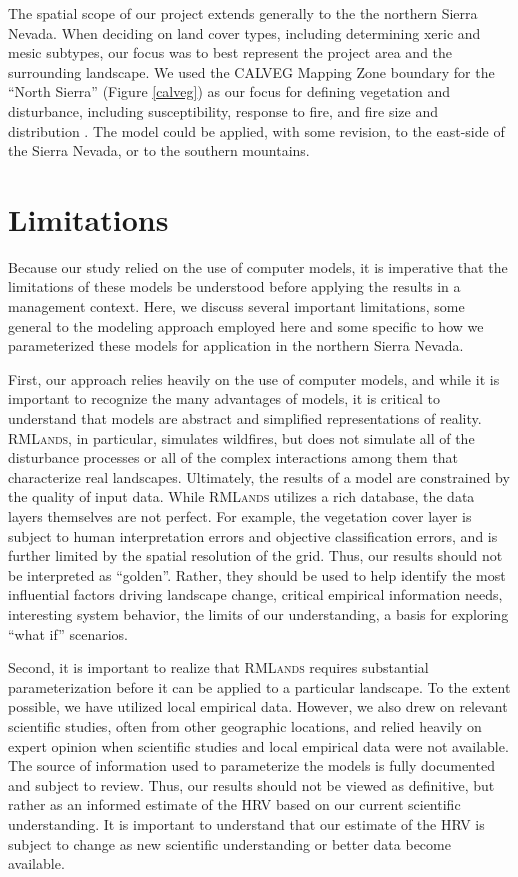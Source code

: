 The spatial scope of our project extends generally to the the northern Sierra Nevada. When deciding on land cover types, including determining xeric and mesic subtypes, our focus was to best represent the project area and the surrounding landscape. We used the CALVEG Mapping Zone boundary for the ``North Sierra'' (Figure \ref{calveg}) as our focus for defining vegetation and disturbance, including susceptibility, response to fire, and fire size and distribution . The model could be applied, with some revision, to the east-side of the Sierra Nevada, or to the southern mountains.

\section{Limitations}

Because our study relied on the use of computer models, it is imperative that the limitations of these models be understood before applying the results in a management context. Here, we discuss several important limitations, some general to the modeling approach employed here and some specific to how we parameterized these models for application in the northern Sierra Nevada.

First, our approach relies heavily on the use of computer models, and while it is important to recognize the many advantages of models, it is critical to understand that models are abstract and simplified representations of reality. \textsc{RMLands}, in particular, simulates wildfires, but does not simulate all of the disturbance processes or all of the complex interactions among them that characterize real landscapes. Ultimately, the results of a model are constrained by the quality of input data. While \textsc{RMLands} utilizes a rich database, the data layers themselves are not perfect. For example, the vegetation cover layer is subject to human interpretation errors and objective classification errors, and is further limited by the spatial resolution of the grid. Thus, our results should not be interpreted as ``golden''. Rather, they should be used to help identify the most influential factors driving landscape change, critical empirical information needs, interesting system behavior, the limits of our understanding, a basis for exploring “what if” scenarios.

Second, it is important to realize that \textsc{RMLands} requires substantial parameterization before it can be applied to a particular landscape. To the extent possible, we have utilized local empirical data. However, we also drew on relevant scientific studies, often from other geographic locations, and relied heavily on expert opinion when scientific studies and local empirical data were not available. The source of information used to parameterize the models is fully documented and subject to review. Thus, our results should not be viewed as definitive, but rather as an informed estimate of the HRV based on our current scientific understanding. It is important to understand that our estimate of the HRV is subject to change as new scientific understanding or better data become available.

